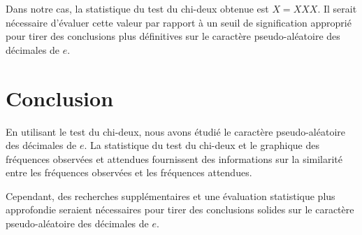 \documentclass{article}
\begin{document}
Dans notre cas, la statistique du test du chi-deux obtenue est \(X = XXX\). Il serait nécessaire d'évaluer cette valeur par rapport à un seuil de signification approprié pour tirer des conclusions plus définitives sur le caractère pseudo-aléatoire des décimales de \(e\).

\section{Conclusion}

En utilisant le test du chi-deux, nous avons étudié le caractère pseudo-aléatoire des décimales de \(e\). La statistique du test du chi-deux et le graphique des fréquences observées et attendues fournissent des informations sur la similarité entre les fréquences observées et les fréquences attendues.

Cependant, des recherches supplémentaires et une évaluation statistique plus approfondie seraient nécessaires pour tirer des conclusions solides sur le caractère pseudo-aléatoire des décimales de \(e\).
\end{document}
